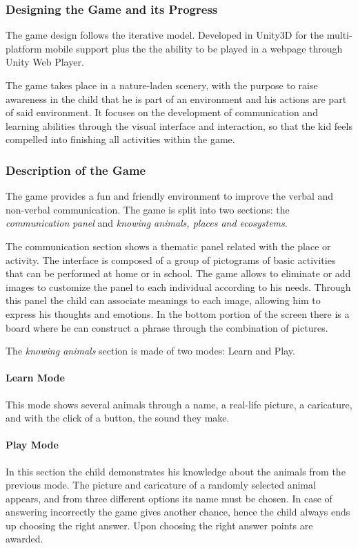 \documentclass[runningheads]{llncs}
\begin{document}
\subsubsection{Designing the Game and its Progress}
\par The game design follows the iterative model. Developed in Unity3D for the multi-platform mobile support plus the the ability to be played in a webpage through Unity Web Player.
\par The game takes place in a nature-laden scenery, with the purpose to raise awareness in the child that he is part of an environment and his actions are part of said environment. It focuses on the development of communication and learning abilities through the visual interface and interaction, so that the kid feels compelled into finishing all activities within the game.

\subsubsection{Description of the Game}
\par The game provides a fun and friendly environment to improve the verbal and non-verbal communication. The game is split into two sections: the \textit{communication panel} and \textit{knowing animals, places and ecosystems}.
\par The communication section shows a thematic panel related with the place or activity. The interface is composed of a group of pictograms of basic activities that can be performed at home or in school. The game allows to eliminate or add images to customize the panel to each individual according to his needs. Through this panel the child can associate meanings to each image, allowing him to express his thoughts and emotions. In the bottom portion of the screen there is a board where he can construct a phrase through the combination of pictures.
\par The \textit{knowing animals} section is made of two modes: Learn and Play.
\paragraph{Learn Mode} This mode shows several animals through a name, a real-life picture, a caricature, and with the click of a button, the sound they make.
\paragraph{Play Mode} In this section the child demonstrates his knowledge about the animals from the previous mode. The picture and caricature of a randomly selected animal appears, and from three different options its name must be chosen. In case of answering incorrectly the game gives another chance, hence the child always ends up choosing the right answer. Upon choosing the right answer points are awarded.
\end{document}
